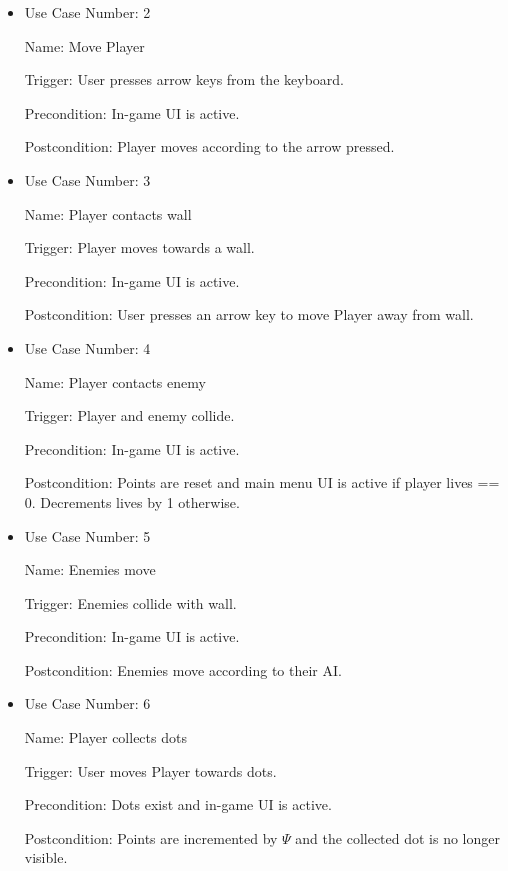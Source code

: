 \documentclass[12pt, titlepage]{article}
\begin{document}
\begin{itemize}
\item
Use Case Number: 2

Name: Move Player

Trigger: User presses arrow keys from the keyboard.

Precondition: In-game UI is active.

Postcondition: Player moves according to the arrow pressed.
\end{itemize}

\begin{itemize}
\item
Use Case Number: 3

Name: Player contacts wall

Trigger: Player moves towards a wall.

Precondition: In-game UI is active.

Postcondition: User presses an arrow key to move Player away from wall.

\end{itemize}

\begin{itemize}
\item
Use Case Number: 4

Name: Player contacts enemy

Trigger: Player and enemy collide.

Precondition: In-game UI is active.

Postcondition: Points are reset and main menu UI is active if player lives == 0. Decrements lives by 1 otherwise.
\end{itemize}

\begin{itemize}
\item
Use Case Number: 5

Name: Enemies move

Trigger: Enemies collide with wall.

Precondition: In-game UI is active.

Postcondition: Enemies move according to their AI.
\end{itemize}

\begin{itemize}
\item
Use Case Number: 6

Name: Player collects dots

Trigger: User moves Player towards dots.

Precondition: Dots exist and in-game UI is active.

Postcondition: Points are incremented by $\hyperref[tab:constants]{\Psi}$ and the collected dot is no longer visible.
\end{itemize}
\end{document}
